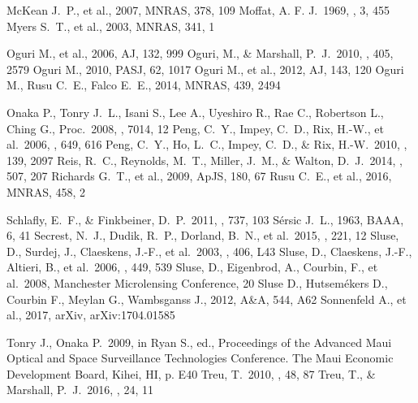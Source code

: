 \documentclass[manuscript]{aastex}
\begin{document}
\begin{thebibliography}{}
 McKean J.~P., et al., 2007, MNRAS, 378, 109 
 Moffat, A. F. J.\ 1969, \aap, 3, 455
 Myers S.~T., et al., 2003, MNRAS, 341, 1 

 Oguri M., et al., 2006, AJ, 132, 999
 Oguri, M., \& Marshall, P.~J.\ 2010, \mnras, 405, 2579 
 Oguri M., 2010, PASJ, 62, 1017 
 Oguri M., et al., 2012, AJ, 143, 120
 Oguri M., Rusu C.~E., Falco E.~E., 2014, MNRAS, 439, 2494

 Onaka P., Tonry J.~L., Isani S., Lee A., Uyeshiro R., Rae C., Robertson L., Ching G., Proc.\ 2008, \procspie, 7014, 12
 Peng, C.~Y., Impey, C.~D., Rix, H.-W., et al.\ 2006, \apj, 649, 616 
 Peng, C.~Y., Ho, L.~C., Impey, C.~D., \& Rix, H.-W.\ 2010, \aj, 139, 2097 
 Reis, R.~C., Reynolds, M.~T., Miller, J.~M., \& Walton, D.~J.\ 2014, \nat, 507, 207 
 Richards G.~T., et al., 2009, ApJS, 180, 67 
 Rusu C.~E., et al., 2016, MNRAS, 458, 2

 Schlafly, E.~F., \& Finkbeiner, D.~P.\ 2011, \apj, 737, 103 
 S{\'e}rsic J.~L., 1963, BAAA, 6, 41 
 Secrest, N.~J., Dudik, R.~P., Dorland, B.~N., et al.\ 2015, \apjs, 221, 12 
 Sluse, D., Surdej, J., Claeskens, J.-F., et al.\ 2003, \aap, 406, L43 
 Sluse, D., Claeskens, J.-F., Altieri, B., et al.\ 2006, \aap, 449, 539 
 Sluse, D., Eigenbrod, A., Courbin, F., et al.\ 2008, Manchester Microlensing Conference, 20 
 Sluse D., Hutsem{\'e}kers D., Courbin F., Meylan G., Wambsganss J., 2012, A\&A, 544, A62
 Sonnenfeld A., et al., 2017, arXiv, arXiv:1704.01585 

 Tonry J., Onaka P.\ 2009, in Ryan S., ed., 
Proceedings of the Advanced Maui Optical and Space Surveillance Technologies Conference.
The Maui Economic Development Board, Kihei, HI, p. E40
 Treu, T.\ 2010, \araa, 48, 87
 Treu, T., \& Marshall, P.~J.\ 2016, \aapr, 24, 11 


\end{thebibliography}
\end{document}
